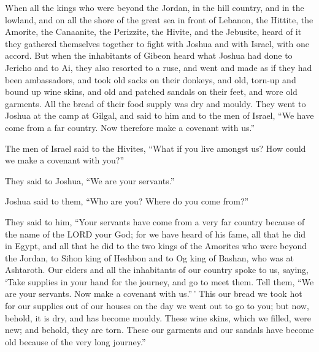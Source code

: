  When all the kings who were beyond the Jordan, in the hill
country, and in the lowland, and on all the shore of the great sea in
front of Lebanon, the Hittite, the Amorite, the Canaanite, the
Perizzite, the Hivite, and the Jebusite, heard of it  they
gathered themselves together to fight with Joshua and with Israel, with
one accord.  But when the inhabitants of Gibeon heard what
Joshua had done to Jericho and to Ai,  they also resorted to
a ruse, and went and made as if they had been ambassadors, and took old
sacks on their donkeys, and old, torn-up and bound up wine skins,
 and old and patched sandals on their feet, and wore old
garments. All the bread of their food supply was dry and mouldy.
 They went to Joshua at the camp at Gilgal, and said to him
and to the men of Israel, ``We have come from a far country. Now
therefore make a covenant with us.''

 The men of Israel said to the Hivites, ``What if you live
amongst us? How could we make a covenant with you?''

 They said to Joshua, ``We are your servants.''

Joshua said to them, ``Who are you? Where do you come from?''

 They said to him, ``Your servants have come from a very far
country because of the name of the LORD your God; for we have heard of
his fame, all that he did in Egypt,  and all that he did to
the two kings of the Amorites who were beyond the Jordan, to Sihon king
of Heshbon and to Og king of Bashan, who was at Ashtaroth. 
Our elders and all the inhabitants of our country spoke to us, saying,
`Take supplies in your hand for the journey, and go to meet them. Tell
them, ``We are your servants. Now make a covenant with us.''\,'
 This our bread we took hot for our supplies out of our
houses on the day we went out to go to you; but now, behold, it is dry,
and has become mouldy.  These wine skins, which we filled,
were new; and behold, they are torn. These our garments and our sandals
have become old because of the very long journey.''

